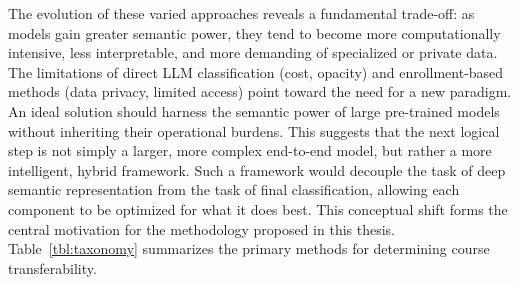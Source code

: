     The evolution of these varied approaches reveals a fundamental trade-off: as models gain greater semantic power, they tend to become more computationally intensive, less interpretable, and more demanding of specialized or private data. The limitations of direct LLM classification (cost, opacity) and enrollment-based methods (data privacy, limited access) point toward the need for a new paradigm. An ideal solution should harness the semantic power of large pre-trained models without inheriting their operational burdens. This suggests that the next logical step is not simply a larger, more complex end-to-end model, but rather a more intelligent, hybrid framework. Such a framework would decouple the task of deep semantic representation from the task of final classification, allowing each component to be optimized for what it does best. This conceptual shift forms the central motivation for the methodology proposed in this thesis.  Table~\ref{tbl:taxonomy} summarizes the primary methods for determining course transferability.

